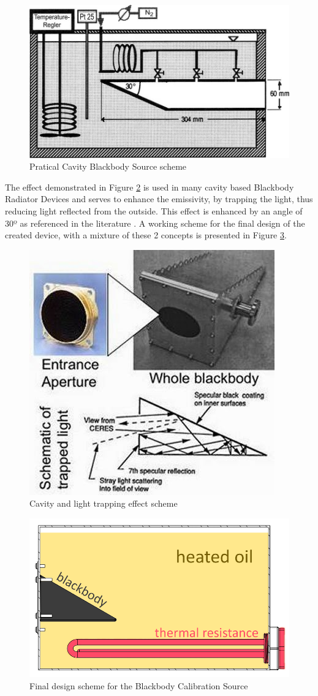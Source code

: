 \begin{figure}
\centering
\includegraphics[width=0.6\linewidth]{Figures/4.Chapter/praticalcavity.png}
\caption{Pratical Cavity Blackbody Source scheme}
\label{fig:bbs}
\end{figure}


\par The effect demonstrated in Figure \ref{fig:blkbody} is used in many cavity based Blackbody Radiator Devices and serves to enhance the emissivity, by trapping the light, thus reducing light reflected from the outside. This effect is enhanced by an angle of 30º as referenced in the literature \cite{blackbody}. A working scheme for the final design of the created device, with a mixture of these 2 concepts is presented in Figure \ref{fig:box}. \\

\begin{figure}[h]
\centering
\includegraphics[width=0.6\linewidth]{Figures/4.Chapter/blackbody3.jpg}
\caption{Cavity and light trapping effect scheme}
\label{fig:blkbody}
\end{figure}

\begin{figure}[h]
\centering
\includegraphics[width=0.6\linewidth]{Figures/4.Chapter/caixa.png}
\caption{Final design scheme for the Blackbody Calibration Source}
\label{fig:box}
\end{figure}

